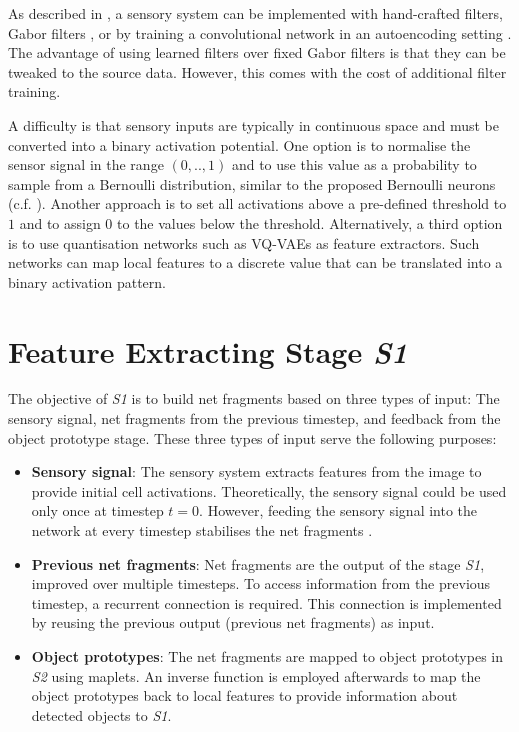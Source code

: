 As described in , a sensory system can be implemented with hand-crafted filters, Gabor filters , or by training a convolutional network in an autoencoding setting . The advantage of using learned filters over fixed Gabor filters is that they can be tweaked to the source data. However, this comes with the cost of additional filter training.

A difficulty is that sensory inputs are typically in continuous space and must be converted into a binary activation potential.
One option is to normalise the sensor signal in the range $(0, .., 1)$ and to use this value as a probability to sample from a Bernoulli distribution, similar to the proposed Bernoulli neurons (c.f. ).
Another approach is to set all activations above a pre-defined threshold to $1$ and to assign 0 to the values below the threshold.
Alternatively, a third option is to use quantisation networks such as VQ-VAEs  as feature extractors. Such networks can map local features to a discrete value that can be translated into a binary activation pattern.


\section{Feature Extracting Stage \emph{S1}}
The objective of \emph{S1} is to build net fragments based on three types of input: The sensory signal, net fragments from the previous timestep, and feedback from the object prototype stage.
These three types of input serve the following purposes:
\begin{itemize}
    \item \textbf{Sensory signal}: The sensory system extracts features from the image to provide initial cell activations. Theoretically, the sensory signal could be used only once at timestep $t=0$. However, feeding the sensory signal into the network at every timestep stabilises the net fragments .
    \item \textbf{Previous net fragments}: Net fragments are the output of the stage \emph{S1}, improved over multiple timesteps.
    To access information from the previous timestep, a recurrent connection is required. This connection is implemented by reusing the previous output (previous net fragments) as input.
    \item \textbf{Object prototypes}: The net fragments are mapped to object prototypes in \emph{S2} using maplets. An inverse function is employed afterwards to map the object prototypes back to local features to provide information about detected objects to \emph{S1}.
\end{itemize}

